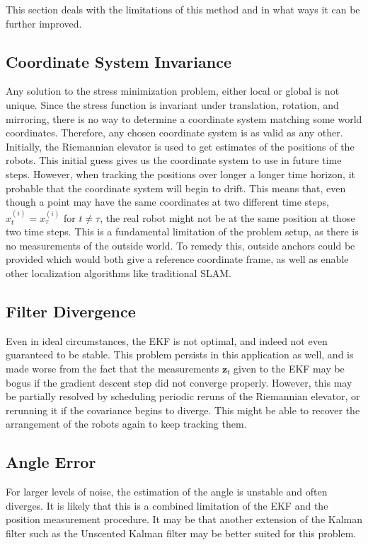 This section deals with the limitations of this method and in what ways it can be further improved.
\subsection{Coordinate System Invariance}
Any solution to the stress minimization problem, either local or global is not unique. Since the stress function is invariant under translation, rotation, and mirroring, there is no way to determine a coordinate system matching some world coordinates. Therefore, any chosen coordinate system is as valid as any other. Initially, the Riemannian elevator is used to get estimates of the positions of the robots. This initial guess gives us the coordinate system to use in future time steps. However, when tracking the positions over longer a longer time horizon, it probable that the coordinate system will begin to drift. This means that, even though a point may have the same coordinates at two different time steps, $x^{(i)}_t = x^{(i)}_\tau$ for $t \neq \tau$, the real robot might not be at the same position at those two time steps. This is a fundamental limitation of the problem setup, as there is no measurements of the outside world. To remedy this, outside anchors could be provided which would both give a reference coordinate frame, as well as enable other localization algorithms like traditional SLAM. 

\subsection{Filter Divergence}
Even in ideal circumstances, the EKF is not optimal, and indeed not even guaranteed to be stable. This problem persists in this application as well, and is made worse from the fact that the measurements $\mathbf{z}_t$ given to the EKF may be bogus if the gradient descent step did not converge properly. However, this may be partially resolved by scheduling periodic reruns of the Riemannian elevator, or rerunning it if the covariance begins to diverge. This might be able to recover the arrangement of the robots again to keep tracking them.

\subsection{Angle Error}
For larger levels of noise, the estimation of the angle is unstable and often diverges. It is likely that this is a combined limitation of the EKF and the position measurement procedure. It may be that another extension of the Kalman filter such as the Unscented Kalman filter may be better suited for this problem. 